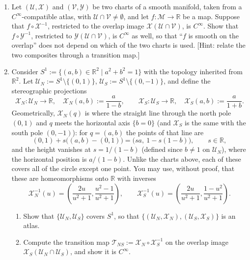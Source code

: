 \documentclass[11pt]{article}
\begin{document}
\begin{enumerate}[label=\textbf{3.\arabic*}, leftmargin=2.2cm, start=8]

\item \label{prob:chart-independence}
Let $(\mathcal U,\mathcal X)$ and $(\mathcal V,\mathcal Y)$ be two charts of a smooth manifold, taken from a $C^\infty$-compatible atlas, with $\mathcal U\cap\mathcal V\neq\emptyset$, and let $f:\mathcal M\to\mathbb R$ be a map. Suppose that $f\circ\mathcal X^{-1}$, restricted to the overlap image $\mathcal X(\mathcal U\cap\mathcal V)$, is $C^\infty$. Show that $f\circ\mathcal Y^{-1}$, restricted to $\mathcal Y(\mathcal U\cap\mathcal V)$, is $C^\infty$ as well, so that ``$f$ is smooth on the overlap'' does not depend on which of the two charts is used. [Hint: relate the two composites through a transition map.]

\item \label{prob:circle-atlas}
Consider $S^1:=\{(a,b)\in\mathbb R^2\mid a^2+b^2=1\}$ with the topology inherited from $\mathbb R^2$. Let $\mathcal U_N:=S^1\setminus\{(0,1)\}$, $\mathcal U_S:=S^1\setminus\{(0,-1)\}$, and define the stereographic projections
\[
\mathcal X_N:\mathcal U_N\to\mathbb R,\quad \mathcal X_N(a,b):=\frac{a}{1-b},\qquad
\mathcal X_S:\mathcal U_S\to\mathbb R,\quad \mathcal X_S(a,b):=\frac{a}{1+b}.
\]
Geometrically, $\mathcal X_N(q)$ is where the straight line through the north pole $(0,1)$ and $q$ meets the horizontal axis $\{b=0\}$ (and $\mathcal X_S$ is the same with the south pole $(0,-1)$): for $q=(a,b)$ the points of that line are
\[
(0,1)+s\big((a,b)-(0,1)\big)=\big(sa,\ 1-s(1-b)\big),\qquad s\in\mathbb R,
\]
and the height vanishes at $s=1/(1-b)$ (defined since $b\neq1$ on $\mathcal U_N$), where the horizontal position is $a/(1-b)$. Unlike the charts above, each of these covers all of the circle except one point. You may use, without proof, that these are homeomorphisms onto $\mathbb R$ with inverses
\[
\mathcal X_N^{-1}(u)=\left(\frac{2u}{u^2+1},\frac{u^2-1}{u^2+1}\right),\qquad
\mathcal X_S^{-1}(u)=\left(\frac{2u}{u^2+1},\frac{1-u^2}{u^2+1}\right).
\]
\begin{enumerate}[label=(\alph*)]
  \item Show that $\{\mathcal U_N,\mathcal U_S\}$ covers $S^1$, so that $\{(\mathcal U_N,\mathcal X_N),(\mathcal U_S,\mathcal X_S)\}$ is an atlas.
  \item Compute the transition map $\mathcal T_{NS}:=\mathcal X_N\circ\mathcal X_S^{-1}$ on the overlap image $\mathcal X_S(\mathcal U_N\cap\mathcal U_S)$, and show it is $C^\infty$.
\end{enumerate}

\end{enumerate}
\end{document}
